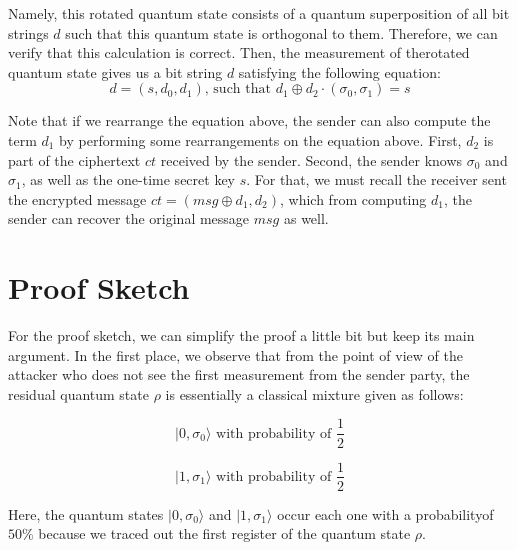 \documentclass[12pt]{article}
\begin{document}
    \noindent Namely, this rotated quantum state consists of a quantum superposition of all bit strings $d$ such that this quantum state is orthogonal to them. Therefore, we can verify that this calculation is correct. Then, the measurement of the\break rotated quantum state gives us a bit string $d$ satisfying the following equation:
    $$ d = (s, {d}_{0}, {d}_{1}) \mathrm{\text{, such that }} {d}_{1} \oplus {d}_{2} \cdot ({\sigma}_{0}, {\sigma}_{1}) = s $$
    
    \noindent Note that if we rearrange the equation above, the sender can also compute the term ${d}_{1}$ by performing some rearrangements on the equation above. First, ${d}_{2}$ is part of the ciphertext $ct$ received by the sender. Second, the sender knows ${\sigma}_{0}$ and ${\sigma}_{1}$, as well as the one-time secret key $s$. For that, we must recall the receiver sent the encrypted message $ct = (msg \oplus {d}_{1}, {d}_{2})$, which from computing ${d}_{1}$, the sender can recover the original message $msg$ as well.

    
    \section{Proof Sketch}
    \label{sec:proof-sketch}

    For the proof sketch, we can simplify the proof a little bit but keep its main argument. In the first place, we observe that from the point of view of the attacker who does not see the first measurement from the sender party, the residual quantum state $\rho$ is essentially a classical mixture given as follows:
    
    $$ |0, {\sigma}_{0}\rangle \mathrm{\text{ with probability of }} \frac{1}{2} $$
    
    $$ |1, {\sigma}_{1}\rangle \mathrm{\text{ with probability of }} \frac{1}{2} $$

    \noindent Here, the quantum states $|0, {\sigma}_{0}\rangle$ and $|1, {\sigma}_{1}\rangle$ occur each one with a probability\break of $50\%$ because we traced out the first register of the quantum state $\rho$.
    
\end{document}
